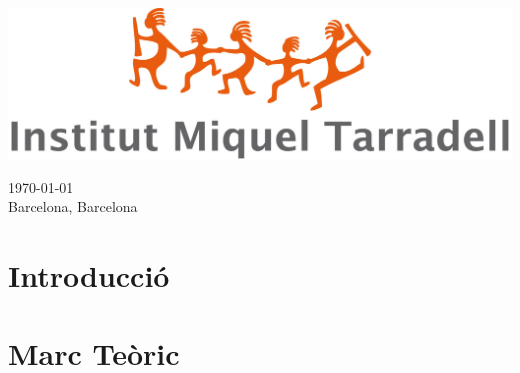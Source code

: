 \documentclass[a4paper,12pt,arial,numbered,print,index,oneside]{book}
\newcommand\blankpage{%
	\null
	\thispagestyle{empty}%
	\addtocounter{page}{-1}%
	\newpage}
\begin{document}
\begin{titlepage}
\begin{center}
\begin{singlespace}
		\begin{minipage}{0.85\textwidth}
			\begin{center}
								\includegraphics[scale=0.2]{Figures/Cover/logo-tarradell.jpg}
			\end{center}
		\end{minipage}
		
		\vspace{.5cm}
		
		
		{\large \today} \\
		\large Barcelona, Barcelona  
		
		
		\vfill %
		\end{singlespace}
		\end{center}
		
	\end{titlepage}

	\begin{onehalfspacing}
	\afterpage{\blankpage}
	\begin{onehalfspacing}
	\tableofcontents
	\end{onehalfspacing}
	\end{onehalfspacing}
	
	\clearpage
	
	\thispagestyle{plain}
	
	\part*{Introducció}
	\label{part:intro}
	
	
	\part{Marc Teòric}
	\label{part:theoretical_framework}
	
	
\end{document}
